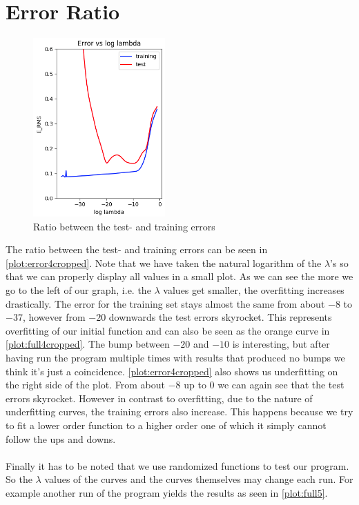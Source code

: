\documentclass{article}
\begin{document}
\newpage
\section{Error Ratio}

\begin{figure} %
	\centering
	\includegraphics[width=0.45\textwidth]{plots/error4cropped.png}
	\caption{Ratio between the test- and training errors}
	\label{plot:error4cropped}
\end{figure}

The ratio between the test- and training errors can be seen in \autoref{plot:error4cropped}. Note that we have taken the natural logarithm of the $\lambda$'s so that we can properly display all values in a small plot. As we can see the more we go to the left of our graph, i.e. the $\lambda$ values get smaller, the overfitting increases drastically. The error for the training set stays almost the same from about $-8$ to $-37$, however from $-20$ downwards the test errors skyrocket. This represents overfitting of our initial function and can also be seen as the orange curve in \autoref{plot:full4cropped}. The bump between $-20$ and $-10$ is interesting, but after having run the program multiple times with results that produced no bumps we think it's just a coincidence. \autoref{plot:error4cropped} also shows us underfitting on the right side of the plot. From about $-8$ up to $0$ we can again see that the test errors skyrocket. However in contrast to overfitting, due to the nature of underfitting curves, the training errors also increase. This happens because we try to fit a lower order function to a higher order one of which it simply cannot follow the ups and downs. \\
\\
Finally it has to be noted that we use randomized functions to test our program. So the $\lambda$ values of the curves and the curves themselves may change each run. For example another run of the program yields the results as seen in \autoref{plot:full5}.
\end{document}
